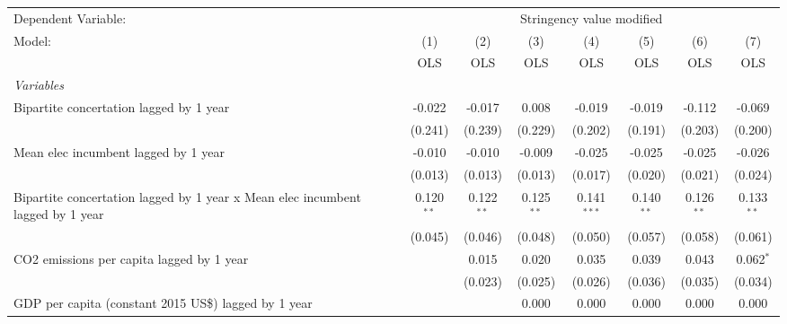 
\begingroup
\centering
\begin{tabular}{lccccccc}
   \toprule
   Dependent Variable: & \multicolumn{7}{c}{Stringency value modified}\\
   Model:                                                                         & (1)          & (2)          & (3)          & (4)           & (5)           & (6)           & (7)\\  
                                                                                  &  OLS         & OLS          & OLS          & OLS           & OLS           & OLS           & OLS\\  
   \midrule
   \emph{Variables}\\
   Bipartite concertation lagged by 1 year                                        & -0.022       & -0.017       & 0.008        & -0.019        & -0.019        & -0.112        & -0.069\\   
                                                                                  & (0.241)      & (0.239)      & (0.229)      & (0.202)       & (0.191)       & (0.203)       & (0.200)\\   
   Mean elec incumbent lagged by 1 year                                           & -0.010       & -0.010       & -0.009       & -0.025        & -0.025        & -0.025        & -0.026\\   
                                                                                  & (0.013)      & (0.013)      & (0.013)      & (0.017)       & (0.020)       & (0.021)       & (0.024)\\   
   Bipartite concertation lagged by 1 year x Mean elec incumbent lagged by 1 year & 0.120$^{**}$ & 0.122$^{**}$ & 0.125$^{**}$ & 0.141$^{***}$ & 0.140$^{**}$  & 0.126$^{**}$  & 0.133$^{**}$\\   
                                                                                  & (0.045)      & (0.046)      & (0.048)      & (0.050)       & (0.057)       & (0.058)       & (0.061)\\   
   CO2 emissions per capita lagged by 1 year                                      &              & 0.015        & 0.020        & 0.035         & 0.039         & 0.043         & 0.062$^{*}$\\   
                                                                                  &              & (0.023)      & (0.025)      & (0.026)       & (0.036)       & (0.035)       & (0.034)\\   
   GDP per capita (constant 2015 US\$) lagged by 1 year                           &              &              & 0.000        & 0.000         & 0.000         & 0.000         & 0.000\\   

\end{tabular}
